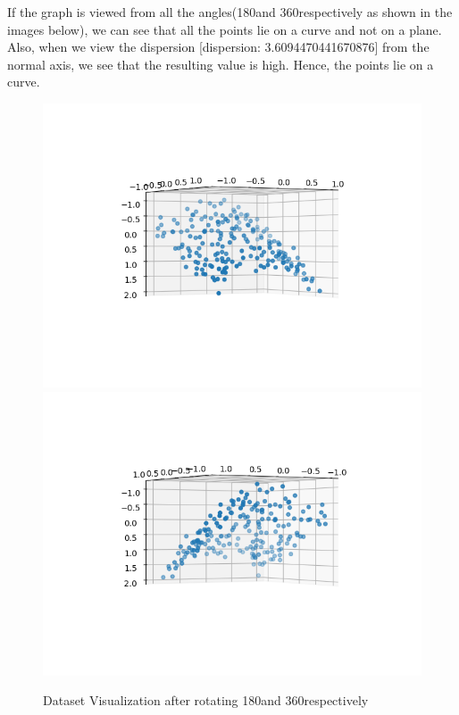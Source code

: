 \documentclass[10pt]{article}
\begin{document}
If the graph is viewed from all the angles(180\textdegree and 360\textdegree respectively as shown in the images below), we can see that all the points lie on a curve and not on a plane. Also, when we view the dispersion [dispersion:  3.6094470441670876] from the normal axis, we see that the resulting value is high. Hence, the points lie on a curve.

\begin{figure}[hbt!]
  \begin{center}
    \includegraphics[scale=0.4]{./images/Figure_1_180.png}
    \includegraphics[scale=0.4]{./images/Figure_1_360.png}
    \caption{Dataset Visualization after rotating 180\textdegree and 360\textdegree respectively}
  \end{center}
\end{figure}
\vspace{10mm}
\end{document}
